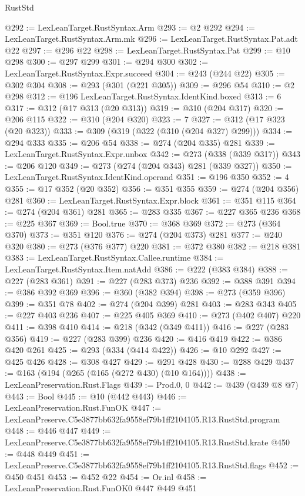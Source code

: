 \begin{lexlean}{RustStd}
\begin{coremodule}
@292 := LexLeanTarget.RustSyntax.Arm
@293 := @2 @292
@294 := LexLeanTarget.RustSyntax.Arm.mk
@296 := LexLeanTarget.RustSyntax.Pat.adt @22
@297 := @296 @22
@298 := LexLeanTarget.RustSyntax.Pat
@299 := @10 @298
@300 := @297 @299
@301 := @294 @300
@302 := LexLeanTarget.RustSyntax.Expr.succeed
@304 := @243 (@244 @22)
@305 := @302 @304
@308 := @293 (@301 (@221 @305))
@309 := @296 @54
@310 := @2 @298
@312 := @196 LexLeanTarget.RustSyntax.IdentKind.boxed
@313 := 6
@317 := @312 (@17 @313 (@20 @313))
@319 := @310 (@204 @317)
@320 := @206 @115
@322 := @310 (@204 @320)
@323 := 7
@327 := @312 (@17 @323 (@20 @323))
@333 := @309 (@319 (@322 (@310 (@204 @327) @299)))
@334 := @294 @333
@335 := @206 @54
@338 := @274 (@204 @335) @281
@339 := LexLeanTarget.RustSyntax.Expr.unbox
@342 := @273 (@338 (@339 @317))
@343 := @206 @120
@349 := @273 (@274 (@204 @343) @281 (@339 @327))
@350 := LexLeanTarget.RustSyntax.IdentKind.operand
@351 := @196 @350
@352 := 4
@355 := @17 @352 (@20 @352)
@356 := @351 @355
@359 := @274 (@204 @356) @281
@360 := LexLeanTarget.RustSyntax.Expr.block
@361 := @351 @115
@364 := @274 (@204 @361) @281
@365 := @283 @335
@367 := @227 @365 @236
@368 := @225 @367
@369 := Bool.true
@370 := @368 @369
@372 := @273 (@364 @370)
@373 := @351 @120
@376 := @274 (@204 @373) @281
@377 := @240 @320
@380 := @273 (@376 @377) @220
@381 := @372 @380
@382 := @218 @381
@383 := LexLeanTarget.RustSyntax.Callee.runtime
@384 := LexLeanTarget.RustSyntax.Item.natAdd
@386 := @222 (@383 @384)
@388 := @227 (@283 @361)
@391 := @227 (@283 @373) @236
@392 := @388 @391
@394 := @386 @392 @369
@396 := @360 (@382 @394)
@398 := @273 (@359 @396)
@399 := @351 @78
@402 := @274 (@204 @399) @281
@403 := @283 @343
@405 := @227 @403 @236
@407 := @225 @405 @369
@410 := @273 (@402 @407) @220
@411 := @398 @410
@414 := @218 (@342 (@349 @411))
@416 := @227 (@283 @356)
@419 := @227 (@283 @399) @236
@420 := @416 @419
@422 := @386 @420 @261
@425 := @293 (@334 (@414 @422))
@426 := @10 @292
@427 := @425 @426
@428 := @308 @427
@429 := @291 @428
@430 := @288 @429
@437 := @163 (@194 (@265 (@165 (@272 @430) (@10 @164))))
@438 := LexLeanPreservation.Rust.Flags
@439 := Prod.{0, 0}
@442 := @439 (@439 @8 @7)
@443 := Bool
@445 := @10 (@442 @443)
@446 := LexLeanPreservation.Rust.FunOK
@447 := LexLeanPreserve.C5e3877bb632fa9558ef79b1ff2104105.R13.RustStd.program
@448 := @446 @447
@449 := LexLeanPreserve.C5e3877bb632fa9558ef79b1ff2104105.R13.RustStd.krate
@450 := @448 @449
@451 := LexLeanPreserve.C5e3877bb632fa9558ef79b1ff2104105.R13.RustStd.flags
@452 := @450 @451
@453 := @452 @22
@454 := Or.inl
@458 := LexLeanPreservation.Rust.FunOK0 @447 @449 @451

\end{coremodule}
\end{lexlean}
